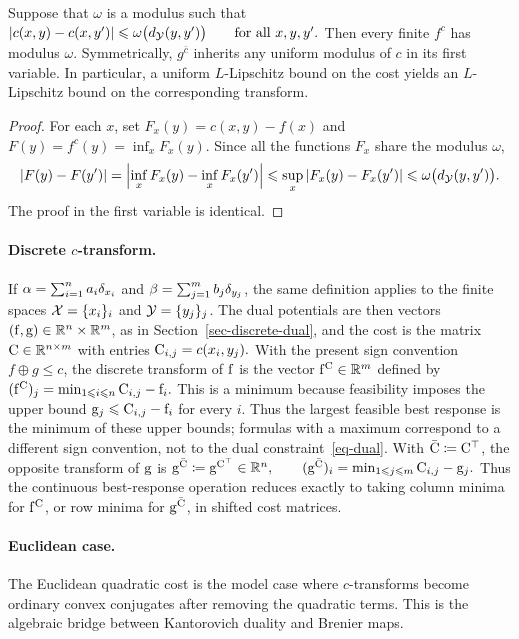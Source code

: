 \begin{prop}\label{prop-c-transform-lipschitz}
Suppose that $\omega$ is a modulus such that
\(|c(x,y)-c(x,y')| \leqslant\omega\bigl(d_{\mathcal{Y}}(y,y')\bigr) \qquad\text{for all }x,y,y'.\)
Then every finite $f^c$ has modulus $\omega$. Symmetrically, $g^{\bar c}$ inherits any uniform modulus of $c$ in its first variable. In particular, a uniform $L$-Lipschitz bound on the cost yields an $L$-Lipschitz bound on the corresponding transform.
\end{prop}
\begin{proof}
For each $x$, set $F_x(y)=c(x,y)-f(x)$ and $F(y)=f^c(y)=\inf_x F_x(y)$. Since all the functions $F_x$ share the modulus $\omega$,
\[
|F(y)-F(y')|
=
\left|\inf_x F_x(y)-\inf_x F_x(y')\right|
\leqslant
\sup_x |F_x(y)-F_x(y')|
\leqslant
\omega\bigl(d_{\mathcal{Y}}(y,y')\bigr).
\]
The proof in the first variable is identical.
\end{proof}
\paragraph{\texorpdfstring{Discrete $c$-transform.}{Discrete c-transform.}}
If $\alpha=\sum_{i=1}^n a_i\delta_{x_i}$ and $\beta=\sum_{j=1}^m b_j\delta_{y_j}$, the same definition applies to the finite spaces $\mathcal{X}=\{x_i\}_i$ and $\mathcal{Y}=\{y_j\}_j$. The dual potentials are then vectors $(\mathrm{f},\mathrm{g})\in\mathbb{R}^n\times\mathbb{R}^m$, as in Section~\ref{sec-discrete-dual}, and the cost is the matrix $\mathrm{C}\in\mathbb{R}^{n\times m}$ with entries
\(\mathrm{C}_{i,j}=c(x_i,y_j).\)
With the present sign convention $f\oplus g\leq c$, the discrete transform of $\mathrm{f}$ is the vector $\mathrm{f}^{\mathrm{C}}\in\mathbb{R}^m$ defined by \((\mathrm{f}^{\mathrm{C}})_j = \min_{1\leqslant i\leqslant n} \mathrm{C}_{i,j}-\mathrm{f}_i.\)
This is a minimum because feasibility imposes the upper bound $\mathrm{g}_j\leqslant \mathrm{C}_{i,j}-\mathrm{f}_i$ for every $i$. Thus the largest feasible best response is the minimum of these upper bounds; formulas with a maximum correspond to a different sign convention, not to the dual constraint~\eqref{eq-dual}. With $\bar{\mathrm{C}}\coloneqq\mathrm{C}^\top$, the opposite transform of $\mathrm{g}$ is
\(\mathrm{g}^{\bar{\mathrm{C}}}\coloneqq \mathrm{g}^{\mathrm{C}^\top}\in\mathbb{R}^n, \qquad (\mathrm{g}^{\bar{\mathrm{C}}})_i = \min_{1\leqslant j\leqslant m} \mathrm{C}_{i,j}-\mathrm{g}_j.\)
Thus the continuous best-response operation reduces exactly to taking column minima for $\mathrm{f}^{\mathrm{C}}$, or row minima for $\mathrm{g}^{\bar{\mathrm{C}}}$, in shifted cost matrices.

\paragraph{Euclidean case.}
The Euclidean quadratic cost is the model case where $c$-transforms become ordinary convex conjugates after removing the quadratic terms. This is the algebraic bridge between Kantorovich duality and Brenier maps.

